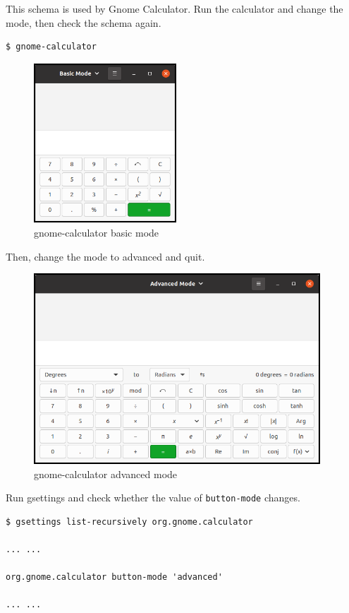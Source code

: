 This schema is used by Gnome Calculator. Run the calculator and change
the mode, then check the schema again.

\begin{lstlisting}
$ gnome-calculator
\end{lstlisting}

\begin{figure}
\centering
\includegraphics[width=5.34cm,height=5.97cm]{../image/gnome_calculator_basic.png}
\caption{gnome-calculator basic mode}
\end{figure}

Then, change the mode to advanced and quit.

\begin{figure}
\centering
\includegraphics[width=10.74cm,height=7.14cm]{../image/gnome_calculator_advanced.png}
\caption{gnome-calculator advanced mode}
\end{figure}

Run gsettings and check whether the value of
\passthrough{\lstinline!button-mode!} changes.

\begin{lstlisting}
$ gsettings list-recursively org.gnome.calculator

... ...

org.gnome.calculator button-mode 'advanced'

... ...
\end{lstlisting}

